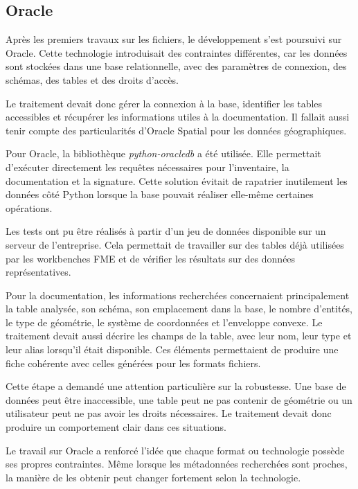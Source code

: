 
\subsection{Oracle}
\label{subsec:oracle}

Après les premiers travaux sur les fichiers, le développement s'est poursuivi
sur Oracle. Cette technologie introduisait des contraintes différentes, car les
données sont stockées dans une base relationnelle, avec des paramètres de
connexion, des schémas, des tables et des droits d'accès.

Le traitement devait donc gérer la connexion à la base, identifier les tables
accessibles et récupérer les informations utiles à la documentation. Il fallait
aussi tenir compte des particularités d'Oracle Spatial pour les données
géographiques.

Pour Oracle, la bibliothèque \textit{python-oracledb} a été utilisée. Elle
permettait d'exécuter directement les requêtes nécessaires pour l'inventaire, la
documentation et la signature. Cette solution évitait de rapatrier inutilement
les données côté Python lorsque la base pouvait réaliser elle-même certaines
opérations.

Les tests ont pu être réalisés à partir d'un jeu de données disponible sur un
serveur de l'entreprise. Cela permettait de travailler sur des tables déjà
utilisées par les workbenches FME et de vérifier les résultats sur des données
représentatives.

Pour la documentation, les informations recherchées concernaient principalement
la table analysée, son schéma, son emplacement dans la base, le nombre
d'entités, le type de géométrie, le système de coordonnées et l'enveloppe
convexe. Le traitement devait aussi décrire les champs de la table, avec leur
nom, leur type et leur alias lorsqu'il était disponible. Ces éléments
permettaient de produire une fiche cohérente avec celles générées pour les
formats fichiers.

Cette étape a demandé une attention particulière sur la robustesse. Une base de
données peut être inaccessible, une table peut ne pas contenir de géométrie ou
un utilisateur peut ne pas avoir les droits nécessaires. Le traitement devait
donc produire un comportement clair dans ces situations.

Le travail sur Oracle a renforcé l'idée que chaque format ou technologie possède
ses propres contraintes. Même lorsque les métadonnées recherchées sont proches,
la manière de les obtenir peut changer fortement selon la technologie.

